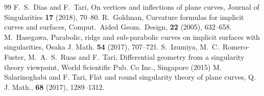 \documentclass[10pt,a4paper]{amsart}
\begin{document}
\begin{thebibliography}{99}
 F.~S.~Dias and F.~Tari, On vertices and inflections of plane curves, Journal of Singularities \textbf{17} (2018), 70--80.
 R.~Goldman, Curvature formulas for implicit curves and surfaces, Comput.\ Aided Geom.\ Design, \textbf{22} (2005), 632--658.
 M.~Hasegawa, Parabolic, ridge and sub-parabolic curves on implicit surfaces with singularities, Osaka J. Math. \textbf{54} (2017), 707--721.
 S.~Izumiya, M.~C.~Romero-Fuster, M.~A.~S.~Ruas and F.~Tari, Differential geometry from a singularity theory viewpoint, World Scientific Pub. Co Inc., Singapore (2015)
 M. Salarinoghabi and F. Tari, Flat and round singularity theory of plane curves, Q. J. Math., \textbf{68} (2017), 1289--1312.
\end{thebibliography}
\end{document}
